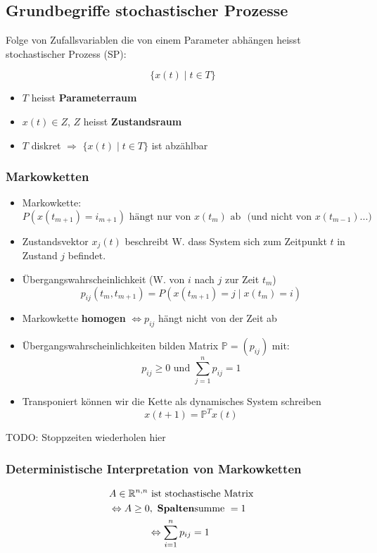 \documentclass[a4paper]{article}
\newcommand{\R}{\mathbb{R}}
\begin{document}
\subsection{Grundbegriffe stochastischer Prozesse}
Folge von Zufallsvariablen die von einem Parameter
abhängen heisst stochastischer Prozess (SP):

\[
\{
	x(t) \; \vert \; t \in T
\} 
\] 

\begin{itemize}
	\item $T$ heisst \textbf{Parameterraum} 
	\item $x(t) \in Z$, $Z$ heisst \textbf{Zustandsraum} 
	\item $T$ diskret $\Rightarrow$ $\{
			x(t) \; \vert \; t \in T
	\} $ ist abzählbar
\end{itemize}

\subsubsection{Markowketten}
\begin{itemize}
	\item Markowkette:
		\[
			P(x(t_{m+1}) = i_{m+1})
			\text{ hängt nur von $x(t_m)$ ab }
			\text{ (und nicht von $x(t_{m-1})...$) }
		\] 
	\item Zustandsvektor $x_{j} (t)$ beschreibt W. dass System
		sich zum Zeitpunkt $t$ in Zustand $j$ befindet.
	\item Übergangswahrscheinlichkeit (W. von $i$ nach $j$ zur Zeit $t_m$)
		\[
			p_{ij} (t_m , t_{m+1}) =
			P(x(t_{m+1}) = j \; \vert \; x(t_m) = i)
		\] 
	\item Markowkette \textbf{homogen} $\Leftrightarrow
		p_{ij}$ hängt nicht von der Zeit ab
	\item Übergangswahrscheinlichkeiten bilden Matrix $\mathbb{P} = (p_{ij})$
		mit:
		\[
		p_{ij} \geq 0 \text{ und }
		\sum_{j=1}^{n} p_{ij} = 1
		\] 
	\item Transponiert können wir die Kette als dynamisches System schreiben
		\[
			x(t+1) = \mathbb{P} ^{T} x(t)
		\] 
\end{itemize}

TODO: Stoppzeiten wiederholen hier

\subsubsection{Deterministische Interpretation von Markowketten}
\begin{align*}
	& A \in \R ^{n,n} \text{ ist stochastische Matrix } \\
	&\Leftrightarrow A \geq 0, \text{ \textbf{Spalten}summe } = 1 \\
	& \qquad \qquad \Leftrightarrow \sum_{i=1}^{n} p_{ij} = 1 \\
\end{align*}
\end{document}
